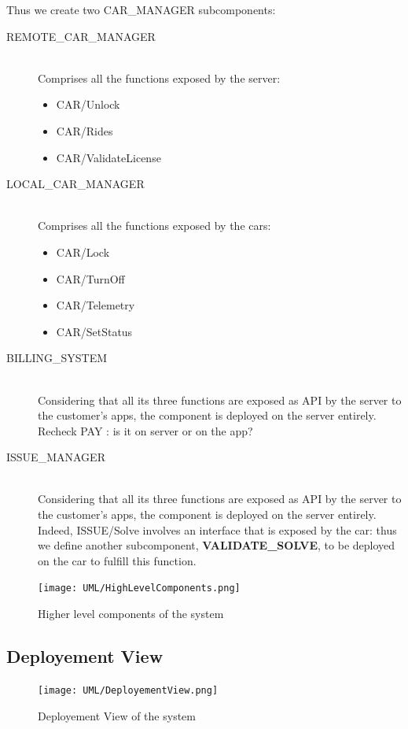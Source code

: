 \documentclass[11pt]{article} %
\begin{document}
Thus we create two CAR\_MANAGER subcomponents:
	\begin{description}
		\item[REMOTE\_CAR\_MANAGER] \hfill \\ Comprises all the functions exposed by the server:
		\begin{itemize}
			\item CAR/Unlock
			\item CAR/Rides
			\item CAR/ValidateLicense
		\end{itemize}
		\item[LOCAL\_CAR\_MANAGER] \hfill \\ Comprises all the functions exposed by the cars:
		\begin{itemize}
			\item CAR/Lock
			\item CAR/TurnOff
			\item CAR/Telemetry
			\item CAR/SetStatus
		\end{itemize}

	\item[BILLING\_SYSTEM] \hfill \\
	Considering that all its three functions are exposed as API by the server to the customer's apps, the component is deployed on the server entirely. {\color{red} {Recheck PAY : is it on server or on the app?}}

	\item[ISSUE\_MANAGER] \hfill \\
	Considering that all its three functions are exposed as API by the server to the customer's apps, the component is deployed on the server entirely. \\
	Indeed, ISSUE/Solve involves an interface that is exposed by the car: thus we define another subcomponent, \textbf{VALIDATE\_SOLVE}, to be deployed on the car to fulfill this function.


\end{description}
\begin{figure}[H]
	\centering
	\texttt{[image: UML/HighLevelComponents.png]}
	\caption{Higher level components of the system}
\end{figure}	


\subsection{Deployement View}
\begin{figure}[H]
	\centering
	\texttt{[image: UML/DeployementView.png]}
	\caption{Deployement View of the system}
\end{figure}	
\end{document}
